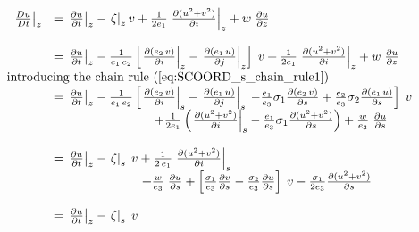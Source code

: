 \documentclass[../main/NEMO_manual]{subfiles}
\begin{document}
\begin{subequations}
  \begin{align*}
    {
    \begin{array}{*{20}l}
      \left. \frac{D u}{D t} \right|_z
      &= \left. {\frac{\partial u }{\partial t}} \right|_z
        - \left. \zeta \right|_z v
        + \frac{1}{2e_1} \left.{ \frac{\partial (u^2+v^2)}{\partial i}} \right|_z
        + w \;\frac{\partial u}{\partial z} \\ \\
      &= \left. {\frac{\partial u }{\partial t}} \right|_z
        -  \frac{1}{e_1 \,e_2 }\left[ { \left.{ \frac{\partial (e_2 \,v)}{\partial i} }\right|_z
        -\left.{ \frac{\partial (e_1 \,u)}{\partial j} }\right|_z } \right] \; v
        +  \frac{1}{2e_1} \left.{ \frac{\partial (u^2+v^2)}{\partial i} } \right|_z
        +  w \;\frac{\partial u}{\partial z}      \\
      \intertext{introducing the chain rule (\autoref{eq:SCOORD_s_chain_rule1}) }
      &= \left. {\frac{\partial u }{\partial t}} \right|_z
        - \frac{1}{e_1\,e_2}\left[ { \left.{ \frac{\partial (e_2 \,v)}{\partial i} } \right|_s
        -\left.{ \frac{\partial (e_1 \,u)}{\partial j} } \right|_s } \right.
        \left. {-\frac{e_1}{e_3}\sigma_1 \frac{\partial (e_2 \,v)}{\partial s}
        +\frac{e_2}{e_3}\sigma_2 \frac{\partial (e_1 \,u)}{\partial s}} \right] \; v  \\
      & \qquad \qquad \qquad \qquad
        {
        + \frac{1}{2e_1} \left(                                  \left.  \frac{\partial (u^2+v^2)}{\partial i} \right|_s
        - \frac{e_1}{e_3}\sigma_1 \frac{\partial (u^2+v^2)}{\partial s}               \right)
        + \frac{w}{e_3 } \;\frac{\partial u}{\partial s}
        } \\ \\
      &= \left. {\frac{\partial u }{\partial t}} \right|_z
        - \left. \zeta \right|_s \;v
        + \frac{1}{2\,e_1}\left. {\frac{\partial (u^2+v^2)}{\partial i}} \right|_s \\
      &\qquad \qquad \qquad \quad
        + \frac{w}{e_3 } \;\frac{\partial u}{\partial s}
        + \left[   {\frac{\sigma_1 }{e_3 }\frac{\partial v}{\partial s}
        - \frac{\sigma_2 }{e_3 }\frac{\partial u}{\partial s}}   \right]\;v
        - \frac{\sigma_1 }{2e_3 }\frac{\partial (u^2+v^2)}{\partial s} \\ \\
      &= \left. {\frac{\partial u }{\partial t}} \right|_z
        - \left. \zeta \right|_s \;v

\end{array}}
\end{align*}
\end{subequations}
\end{document}
